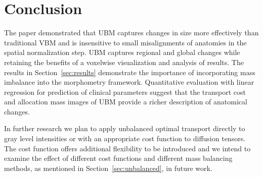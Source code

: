 \documentclass{llncs}
\begin{document}
\section{Conclusion}
The paper demonstrated that UBM captures changes in size more effectively
than traditional VBM and is insensitive to small misalignments of anatomies in
the spatial normalization step. UBM captures regional and global changes while
retaining the benefits of a voxelwise visualization and analysis of results.
The results in Section~\ref{sec:results} demonstrate the importance of
incorporating mass imbalance into the morphometry framework.  Quantitative
evaluation with linear regression for prediction of clinical parameters suggest
that the transport cost and allocation mass images of UBM provide a richer
description of anatomical changes.

In further research we plan to apply unbalanced optimal transport directly to
gray level intensities or with an appropriate cost function to diffusion
tensors. The cost function offers additional flexibility to be introduced and
we intend to examine the effect of different cost functions and different mass
balancing methods, as mentioned in Section~\ref{sec:unbalanced}, in future work. 



\end{document}
